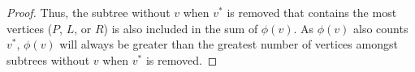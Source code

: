 \documentclass[11pt]{scrartcl}
\theoremstyle{dotlessP}
\theoremstyle{dotlessN}
\begin{document}
\begin{ans}
\begin{proof}
		Thus, the subtree without $v$ when $v^*$ is removed that contains the most vertices ($P$, $L$, or $R$) is also included in the sum of $\phi(v)$. As $\phi(v)$ also counts $v^*$, $\phi(v)$ will always be greater than the greatest number of vertices amongst subtrees without $v$ when $v^*$ is removed.
	\end{proof}
% 
% 
% 			
% 
% 
\end{ans}
\end{document}
